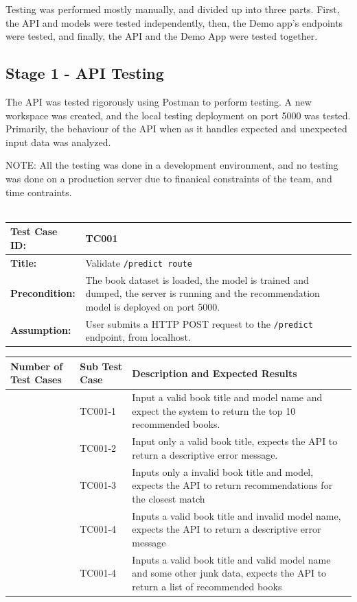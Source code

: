Testing was performed mostly manually, and divided up into three parts. First, the API and models were tested independently, then, the Demo app's endpoints were tested, and finally, the API and the Demo App were tested together.

\subsection*{Stage 1 - API Testing}

The API was tested rigorously using Postman to perform testing. A new workspace was created, and the local testing deployment on port 5000 was tested. Primarily, the behaviour of the API when as it handles expected and unexpected input data was analyzed.

NOTE: All the testing was done in a development environment, and no testing was done on a production server due to finanical constraints of the team, and time contraints.
\\\\

\noindent
\begin{tabularx}{\textwidth}{|>{\raggedright\arraybackslash}p{4cm}|X|}
    \hline
    \textbf{Test Case ID:} & TC001 \\ \hline
    \textbf{Title:} & Validate \texttt{/predict route} \\ \hline
    \textbf{Precondition:} & The book dataset is loaded, the model is trained and dumped, the server is running and the recommendation model is deployed on port 5000. \\ \hline
    \textbf{Assumption:} & User submits a HTTP POST request to the \texttt{/predict} endpoint, from localhost. \\ \hline
\end{tabularx}

\noindent
\begin{tabularx}{\textwidth}{|>{\centering\arraybackslash}p{3cm}|>{\centering\arraybackslash}p{3cm}|X|}
    \hline
    \textbf{Number of Test Cases} & \textbf{Sub Test Case} & \textbf{Description and Expected Results} \\ \hline
    1 & TC001-1 & Input a valid book title and model name and expect the system to return the top 10 recommended books. \\ \hline
    2 & TC001-2 & Input only a valid book title, expects the API to return a descriptive error message. \\ \hline
    3 & TC001-3 & Inputs only a invalid book title and model, expects the API to return recommendations for the closest match \\ \hline
    4 & TC001-4 & Inputs a valid book title and invalid model name, expects the API to return a descriptive error message \\ \hline
    5 & TC001-4 & Inputs a valid book title and valid model name and some other junk data, expects the API to return a list of recommended books \\ \hline
\end{tabularx}

